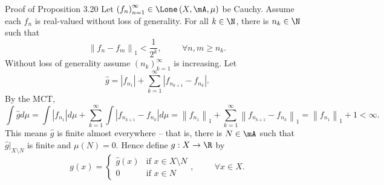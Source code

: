 \documentclass[pmath451]{subfiles}
\begin{document}
    \begin{boxyproof}{Proof of Proposition 3.20}
        Let $\left( f_{n} \right)^{\infty}_{n=1}\in\Lone\left( X,\mA,\mu \right)$ be Cauchy. Assume each $f_n$ is real-valued without loss of generality. For all $k\in\N$, there is $n_k\in\N$ such that
        \begin{equation*}
            \left\lVert f_n-f_m \right\rVert_{1} < \frac{1}{2^k}, \hspace{1cm}\forall n,m\geq n_k.
        \end{equation*}
        Without loss of generality assume $\left( n_{k} \right)^{\infty}_{k=1}$ is increasing. Let
        \begin{equation*}
            \hat{g} = \left| f_{n_1} \right| + \sum^{\infty}_{k=1} \left| f_{n_{k+1}}-f_{n_k} \right|.
        \end{equation*}
        By the MCT,
        \begin{equation*}
            \int \hat{g}d\mu = \int \left| f_{n_1} \right|d\mu + \sum^{\infty}_{k=1}\int\left| f_{n_{k+1}}-f_{n_k} \right|d\mu = \left\lVert f_{n_1} \right\rVert_{1} + \sum^{\infty}_{k=1} \left\lVert f_{n_{k+1}}-f_{n_k} \right\rVert_{1} = \left\lVert f_{n_1} \right\rVert_{1} + 1 < \infty.
        \end{equation*}
        This means $\hat{g}$ is finite almost everywhere -- that is, there is $N\in\mA$ such that $\hat{g}|_{X\setminus N}$ is finite and $\mu\left( N \right) = 0$. Hence define $g:X\to\R$ by
        \begin{equation*}
            g\left( x \right) = \begin{cases} \hat{g}\left( x \right) & \text{if $x\in X\setminus N$} \\ 0 & \text{if $x\in N$} \end{cases}, \hspace{1cm}\forall x\in X.
        \end{equation*}


\end{boxyproof}
\end{document}
